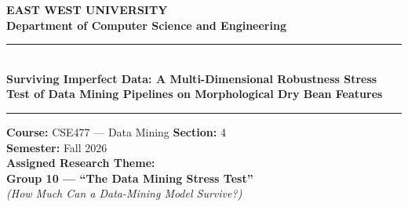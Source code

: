 \documentclass[11pt,a4paper]{article}
\begin{document}
\begin{titlepage}
    \centering
    \vspace*{0.5cm}
    
    {\LARGE \textbf{EAST WEST UNIVERSITY}}\\[0.25cm]
    {\large \textbf{Department of Computer Science and Engineering}}\\[0.6cm]
    
    
    \vspace{0.8cm}
    \rule{\linewidth}{1.2pt}\\[0.4cm]
    {\Large \textbf{Surviving Imperfect Data: A Multi-Dimensional Robustness Stress Test of Data Mining Pipelines on Morphological Dry Bean Features}}\\[0.2cm]
    \rule{\linewidth}{1.2pt}
    
    \vspace{1.0cm}
    {\large \textbf{Course:} CSE477 --- Data Mining \quad \textbf{Section:} 4}\\[0.2cm]
    {\large \textbf{Semester:} Fall 2026}\\[0.4cm]
    {\large \textbf{Assigned Research Theme:}}\\[0.15cm]
    {\large \textbf{Group 10 --- ``The Data Mining Stress Test''}}\\[0.1cm]
    {\textit{(How Much Can a Data-Mining Model Survive?)}}\\[1.2cm]
    
    \noindent{}
    

\end{titlepage}
\end{document}
